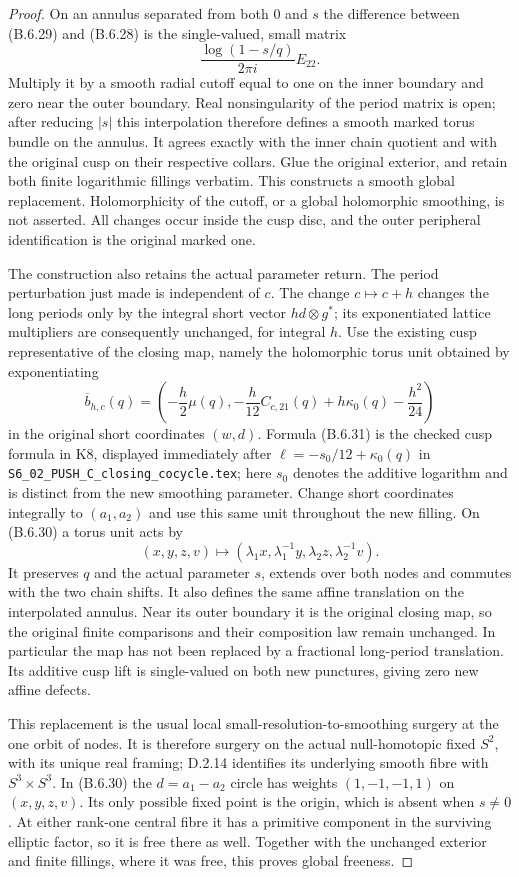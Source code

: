 \begin{proof}
On an annulus separated from both $0$ and $s$ the difference
between (B.6.29) and (B.6.28) is the single-valued, small matrix
\[
 \frac{\log(1-s/q)}{2\pi i}E_{22}.
\]
Multiply it by a smooth radial cutoff equal to one on the inner
boundary and zero near the outer boundary.  Real nonsingularity
of the period matrix is open; after reducing $|s|$ this interpolation
therefore defines a smooth marked torus bundle on the annulus.
It agrees exactly with the inner chain quotient and with the
original cusp on their respective collars.  Glue the original
exterior, and retain both finite logarithmic fillings verbatim.
This constructs a smooth global replacement.  Holomorphicity of
the cutoff, or a global holomorphic smoothing, is not asserted.
All changes occur inside the cusp disc, and the outer peripheral
identification is the original marked one.

The construction also retains the actual parameter return.  The
period perturbation just made is independent of $c$.  The change
$c\mapsto c+h$ changes the long periods only by the integral
short vector $h d\otimes g^*$; its exponentiated lattice
multipliers are consequently unchanged, for integral $h$.
Use the existing cusp representative of the closing map, namely
the holomorphic torus unit obtained by exponentiating
\[
 \overline b_{h,c}(q)=
 \left(-\frac h2\mu(q),
 -\frac h{12}C_{c,21}(q)+h\kappa_0(q)-\frac{h^2}{24}\right)
 \tag{B.6.31}
\]
in the original short coordinates $(w,d)$.  Formula (B.6.31) is
the checked cusp formula in K8, displayed immediately after
$\ell=-s_0/12+\kappa_0(q)$ in
\texttt{S6\_02\_PUSH\_C\_closing\_cocycle.tex}; here $s_0$
denotes the additive logarithm and is distinct from the new
smoothing parameter.  Change short coordinates integrally to
$(a_1,a_2)$ and use this same unit throughout the new filling.
On (B.6.30) a torus unit acts by
\[
 (x,y,z,v)\longmapsto
   (\lambda_1x,\lambda_1^{-1}y,
    \lambda_2z,\lambda_2^{-1}v).
\]
It preserves $q$ and the actual parameter $s$, extends over both
nodes and commutes with the two chain shifts.  It also defines the
same affine translation on the interpolated annulus.  Near its
outer boundary it is the original closing map, so the original
finite comparisons and their composition law remain unchanged.
In particular the map has not been replaced by a fractional
long-period translation.  Its additive cusp lift is single-valued
on both new punctures, giving zero new affine defects.

This replacement is the usual local small-resolution-to-smoothing
surgery at the one orbit of nodes.  It is therefore surgery on
the actual null-homotopic fixed $S^2$, with its unique real
framing; D.2.14 identifies its underlying smooth fibre with
$S^3\times S^3$.  In (B.6.30) the $d=a_1-a_2$ circle has weights
$(1,-1,-1,1)$ on $(x,y,z,v)$.  Its only possible fixed point is
the origin, which is absent when $s\ne0$.  At either rank-one
central fibre it has a primitive component in the surviving
elliptic factor, so it is free there as well.  Together with the
unchanged exterior and finite fillings, where it was free, this
proves global freeness.


\end{proof}
